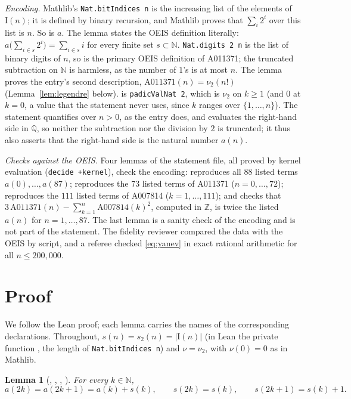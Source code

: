 \documentclass[11pt]{amsart}
\theoremstyle{plain}
\newtheorem{lemma}[theorem]{Lemma}
\theoremstyle{definition}
\newcommand{\N}{\mathbb{N}}
\newcommand{\Q}{\mathbb{Q}}
\newcommand{\vt}{\nu_2}
\newcommand{\Bits}{\mathrm{I}}
\begin{document}
\emph{Encoding.} Mathlib's \texttt{Nat.bitIndices n} is the increasing list of the elements of $\Bits(n)$; it is defined by binary recursion, and Mathlib proves that $\sum_i 2^i$ over this list is $n$. So  is $a$. The lemma  states the OEIS definition literally: $a\bigl(\sum_{i\in s}2^i\bigr)=\sum_{i\in s}i$ for every finite set $s\subset\N$. \texttt{Nat.digits 2 n} is the list of binary digits of $n$, so  is the primary OEIS definition of A011371; the truncated subtraction on $\N$ is harmless, as the number of $1$'s is at most $n$. The lemma  proves the entry's second description, $\mathrm{A011371}(n)=\vt(n!)$ (Lemma~\ref{lem:legendre} below).  is \texttt{padicValNat 2}, which is $\vt$ on $k\ge1$ (and $0$ at $k=0$, a value that the statement never uses, since $k$ ranges over $\{1,\dots,n\}$). The statement quantifies over $n>0$, as the entry does, and evaluates the right-hand side in $\Q$, so neither the subtraction nor the division by $2$ is truncated; it thus also asserts that the right-hand side is the natural number $a(n)$.

\emph{Checks against the OEIS.} Four lemmas of the statement file, all proved by kernel evaluation (\texttt{decide +kernel}), check the encoding:  reproduces all $88$ listed terms $a(0),\dots,a(87)$;  reproduces the $73$ listed terms of A011371 ($n=0,\dots,72$);  reproduces the $111$ listed terms of A007814 ($k=1,\dots,111$); and  checks that $3\,\mathrm{A011371}(n)-\sum_{k=1}^{n}\mathrm{A007814}(k)^2$, computed in $\mathbb{Z}$, is twice the listed $a(n)$ for $n=1,\dots,87$. The last lemma is a sanity check of the encoding and is not part of the statement. The fidelity reviewer compared the data with the OEIS by script, and a referee checked \eqref{eq:yanev} in exact rational arithmetic for all $n\le 200{,}000$.

\section{Proof}\label{sec:proof}

We follow the Lean proof; each lemma carries the names of the corresponding declarations. Throughout, $s(n)=s_2(n)=|\Bits(n)|$ (in Lean the private function , the length of \texttt{Nat.bitIndices n}) and $\nu=\vt$, with $\nu(0)=0$ as in Mathlib.

\begin{lemma}[, , , ]\label{lem:rec}
For every $k\in\N$,
\[
  a(2k)=a(2k+1)=a(k)+s(k),\qquad s(2k)=s(k),\qquad s(2k+1)=s(k)+1 .
\]
\end{lemma}
\end{document}
